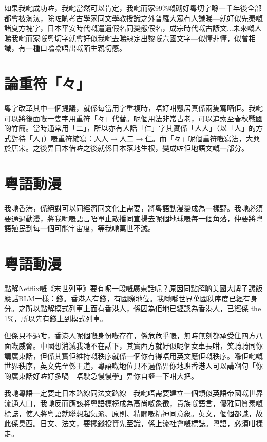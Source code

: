 如果我哋成功咗，我哋當然可以肯定，我哋而家99\%嘅砌好粵切字喺一千年後全部都會被淘汰，除咗啲考古學家同文學教授識之外普羅大眾冇人識睇—就好似先秦嘅諸夏方塊字，日本平安時代嘅遣遺假名同變態假名，成宗時代嘅古諺文...未來嘅人睇我哋而家嘅粵切字就會好似我哋去睇隸定出黎嘅六國文字—似懂非懂，似曾相識，有一種口噏噏唔出嘅陌生親切感。




\section{論重符「々」}
粵字改革其中一個提議，就係每當用字重複時，唔好咁戇居真係兩隻寫晒佢。我哋可以將後面嘅一隻字用重符「々」代替。呢個用法非常古老，可以追索至春秋戰國啲竹簡。當時通常用「二」，所以亦有人話「仁」字其實係「人人」（以「人」的方式對待「人」）嘅重符縮寫：人人$\rightarrow$人二$\rightarrow$仁。而「々」呢個重符嘅寫法，大興於唐宋。之後畀日本借咗之後就係日本落地生根，變成咗佢地語文嘅一部分。





\section{粵語動漫}
我哋香港，係絕對可以同經濟同文化上需要，將粵語動漫變成為一樣野。我哋必須要通過動漫，將我哋嘅語言唔單止散播同宣揚去呢個地球嘅每一個角落，仲要將粵語殖民到每一個可能宇宙度，等我哋萬世不滅。


\section{粵語動漫}
點解Netflix嘅《末世列車》要有呢一段嘅廣東話呢？原因同點解啲美國大牌子𦧲飯應話BLM一樣：錢。香港人有錢，有國際地位。我哋喺世界萬國秩序度已經有身分。之所以點解模式列車上面有香港人，係因為佢地已經認為香港人，已經係 the 1\%，所以先有錢上到模式列車。

但係只不過咁，香港人呢個嘅身份嘅存在，係危危乎嘅，無時無刻都承受住四方八面嘅威脅。中國想消滅我哋不在話下，其實西方就好似呢個女車長咁，笑騎騎同你講廣東話，但係其實佢維持嘅秩序就係一個你冇得唔用英文應佢嘅秩序。喺佢哋嘅世界秩序，英文先至係王道，粵語嘅地位只不過係畀你地班香港人可以講嗰句「你啲廣東話好咗好多喎—唔駛急慢慢學」畀你自韰一下咁大把。

我哋粵語一定要走日本路線同法文路線—我哋唔需要建立一個類似英語帝國嘅世界流通人口，我哋反而應該將粵語標榜成為高尚嘅象徵，貴族嘅語言，優雅同質素嘅標誌，使人將粵語就聯想起氣派、原則、精闢嘅精神同意象。英文，個個都識，故此係臭西。日文、法文，要擺錢投資先至識，係上流社會嘅標誌。粵語，必須咁樣走。

